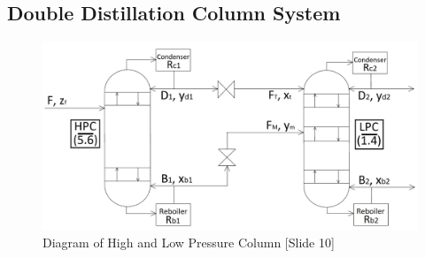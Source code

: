     \newpage
    
    \subsection{Double Distillation Column System}
    \begin{figure}[ht]
        \centering
        \includegraphics[width=0.9\linewidth]{airseparation/handouts/graphics/labelled_columns_diagram_simple.jpg}
        \caption{Diagram of High and Low Pressure Column [Slide 10]}
        \label{fig:column_linkage}
    \end{figure}
    \hfill
    \hfill
